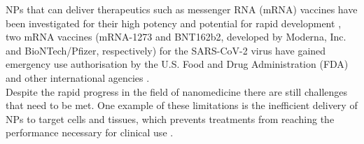 NPs that can deliver therapeutics such as messenger RNA (mRNA) vaccines have been investigated for their high potency and potential for rapid development \parencite{norbert2018,andreas2016}, two mRNA vaccines (mRNA-1273 and BNT162b2, developed by Moderna, Inc. and BioNTech/Pfizer, respectively) for the SARS-CoV-2 virus have gained emergency use authorisation by the U.S. Food and Drug Administration (FDA) and other international agencies \parencite{mrna_1_2020,mrna_2_2021,mrna_3_2021,mrna_4_2020}.\\
Despite the rapid progress in the field of nanomedicine there are still challenges that need to be met. One example of these limitations is the inefficient delivery of NPs to target cells and tissues, which prevents treatments from reaching the performance necessary for clinical use \parencite{dahlman2017,mitchell2020}. 

